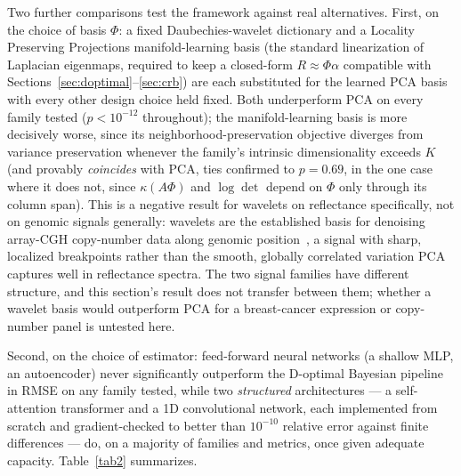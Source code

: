 \documentclass[11pt]{article}
\begin{document}
Two further comparisons test the framework against real alternatives. First, on the choice of basis $\Phi$: a fixed Daubechies-wavelet dictionary and a Locality Preserving Projections manifold-learning basis (the standard linearization of Laplacian eigenmaps, required to keep a closed-form $R\approx\Phi\alpha$ compatible with Sections~\ref{sec:doptimal}--\ref{sec:crb}) are each substituted for the learned PCA basis with every other design choice held fixed. Both underperform PCA on every family tested ($p<10^{-12}$ throughout); the manifold-learning basis is more decisively worse, since its neighborhood-preservation objective diverges from variance preservation whenever the family's intrinsic dimensionality exceeds $K$ (and provably \emph{coincides} with PCA, ties confirmed to $p=0.69$, in the one case where it does not, since $\kappa(A\Phi)$ and $\log\det$ depend on $\Phi$ only through its column span). This is a negative result for wavelets on reflectance specifically, not on genomic signals generally: wavelets are the established basis for denoising array-CGH copy-number data along genomic position~\citep{ref48}, a signal with sharp, localized breakpoints rather than the smooth, globally correlated variation PCA captures well in reflectance spectra. The two signal families have different structure, and this section's result does not transfer between them; whether a wavelet basis would outperform PCA for a breast-cancer expression or copy-number panel is untested here.

Second, on the choice of estimator: feed-forward neural networks (a shallow MLP, an autoencoder) never significantly outperform the D-optimal Bayesian pipeline in RMSE on any family tested, while two \emph{structured} architectures --- a self-attention transformer and a 1D convolutional network, each implemented from scratch and gradient-checked to better than $10^{-10}$ relative error against finite differences --- do, on a majority of families and metrics, once given adequate capacity. Table~\ref{tab2} summarizes.
\end{document}
